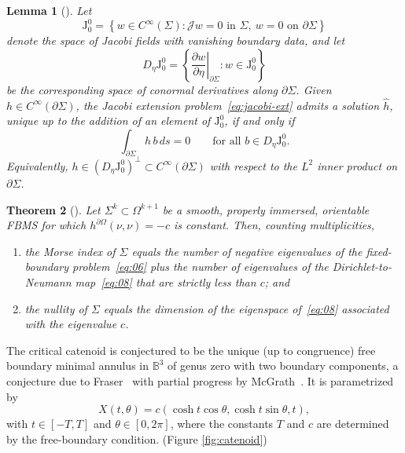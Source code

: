 \documentclass[11pt]{article}
\theoremstyle{definition}
\theoremstyle{plain}
\newtheorem{theorem}{Theorem}[section]
\newtheorem{lemma}[theorem]{Lemma}
\begin{document}
\begin{lemma}[{\cite[Lemma 2.5]{tran01}}]\label{lem:jacobi-ext}
	Let
	\begin{equation}
		\mathrm{J}_0^0 = \left\{ w \in C^\infty(\Sigma) : \mathcal{J} w = 0 \text{ in } \Sigma,\ w = 0 \text{ on } \partial \Sigma \right\}
	\end{equation}
	denote the space of Jacobi fields with vanishing boundary data, and let
	\begin{equation}
		D_\eta \mathrm{J}_0^0 = \left\{ \left.\dfrac{\partial w}{\partial \eta}\right|_{\partial \Sigma} : w \in \mathrm{J}_0^0 \right\}
	\end{equation}
	be the corresponding space of conormal derivatives along $\partial \Sigma$. Given $h \in C^\infty(\partial \Sigma)$, the Jacobi extension problem~\eqref{eq:jacobi-ext} admits a solution $\hat{h}$, unique up to the addition of an element of $\mathrm{J}_0^0$, if and only if
	\begin{equation}
		\int_{\partial \Sigma} h\, b \, ds = 0 \qquad \text{for all } b \in D_\eta \mathrm{J}_0^0.
	\end{equation}
	Equivalently, $h \in (D_\eta \mathrm{J}_0^0)^\perp \subset C^\infty(\partial \Sigma)$ with respect to the $L^2$ inner product on $\partial \Sigma$.
\end{lemma}

\begin{theorem}[{\cite[Theorem 1.2]{tran01}}]\label{thm:tran}
	Let $\Sigma^k \subset \Omega^{k+1}$ be a smooth, properly immersed, orientable FBMS for which $h^{\partial \Omega}(\nu, \nu) = -c$ is constant. Then, counting multiplicities,
	\begin{enumerate}
		\item the Morse index of $\Sigma$ equals the number of negative eigenvalues of the fixed-boundary problem~\eqref{eq:06} plus the number of eigenvalues of the Dirichlet-to-Neumann map~\eqref{eq:08} that are strictly less than $c$; and
		\item the nullity of $\Sigma$ equals the dimension of the eigenspace of~\eqref{eq:08} associated with the eigenvalue $c$.
	\end{enumerate}
\end{theorem}


The critical catenoid is conjectured to be the unique (up to congruence) free boundary minimal annulus in $\mathbb{B}^3$ of genus zero with two boundary components, a conjecture due to Fraser~\cite{fraser03} with partial progress by McGrath~\cite{mcgarth01}. It is parametrized by
\begin{equation}
	X(t, \theta) = c (\cosh t \cos \theta, \cosh t \sin \theta, t),
\end{equation}
with $t \in [-T, T]$ and $\theta \in [0, 2\pi]$, where the constants $T$ and $c$ are determined by the free-boundary condition. (Figure \ref{fig:catenoid})
\end{document}
